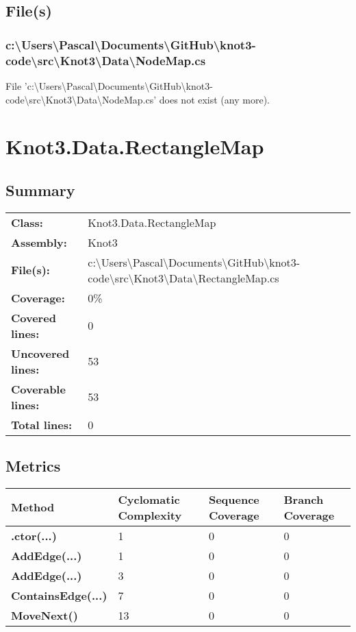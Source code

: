 \documentclass[a4paper,10pt]{article}
\begin{document}
\subsection{File(s)}
\subsubsection{c:\textbackslash Users\textbackslash Pascal\textbackslash Documents\textbackslash GitHub\textbackslash knot3-code\textbackslash src\textbackslash Knot3\textbackslash Data\textbackslash NodeMap.cs}
 File 'c:\textbackslash Users\textbackslash Pascal\textbackslash Documents\textbackslash GitHub\textbackslash knot3-code\textbackslash src\textbackslash Knot3\textbackslash Data\textbackslash NodeMap.cs' does not exist (any more).
\newpage
\section{Knot3.Data.RectangleMap}
\subsection{Summary}
\begin{longtable}[l]{ll}
\textbf{Class:} & Knot3.Data.RectangleMap\\
\textbf{Assembly:} & Knot3\\
\textbf{File(s):} & \begin{minipage}[t]{12cm}{c:\textbackslash Users\textbackslash Pascal\textbackslash Documents\textbackslash GitHub\textbackslash knot3-code\textbackslash src\textbackslash Knot3\textbackslash Data\textbackslash RectangleMap.cs}\end{minipage} \\
\textbf{Coverage:} & 0\%\\
\textbf{Covered lines:} & 0\\
\textbf{Uncovered lines:} & 53\\
\textbf{Coverable lines:} & 53\\
\textbf{Total lines:} & 0\\
\end{longtable}
\subsection{Metrics}
\begin{longtable}[l]{|l|l|l|l|}
\hline
\textbf{Method} & \textbf{Cyclomatic Complexity} & \textbf{Sequence Coverage} & \textbf{Branch Coverage}\\
\hline
\textbf{.ctor(...)} & 1 & 0 & 0\\
\hline
\textbf{AddEdge(...)} & 1 & 0 & 0\\
\hline
\textbf{AddEdge(...)} & 3 & 0 & 0\\
\hline
\textbf{ContainsEdge(...)} & 7 & 0 & 0\\
\hline
\textbf{MoveNext()} & 13 & 0 & 0\\
\hline
\end{longtable}
\end{document}
